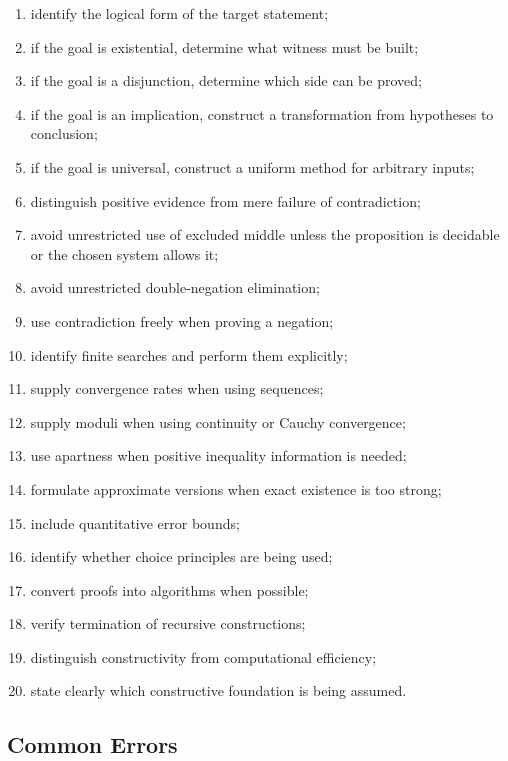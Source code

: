 \begin{enumerate}
    \item identify the logical form of the target statement;
    \item if the goal is existential, determine what witness must be built;
    \item if the goal is a disjunction, determine which side can be proved;
    \item if the goal is an implication, construct a transformation from
          hypotheses to conclusion;
    \item if the goal is universal, construct a uniform method for arbitrary
          inputs;
    \item distinguish positive evidence from mere failure of contradiction;
    \item avoid unrestricted use of excluded middle unless the proposition
          is decidable or the chosen system allows it;
    \item avoid unrestricted double-negation elimination;
    \item use contradiction freely when proving a negation;
    \item identify finite searches and perform them explicitly;
    \item supply convergence rates when using sequences;
    \item supply moduli when using continuity or Cauchy convergence;
    \item use apartness when positive inequality information is needed;
    \item formulate approximate versions when exact existence is too strong;
    \item include quantitative error bounds;
    \item identify whether choice principles are being used;
    \item convert proofs into algorithms when possible;
    \item verify termination of recursive constructions;
    \item distinguish constructivity from computational efficiency;
    \item state clearly which constructive foundation is being assumed.
\end{enumerate}

\subsection{Common Errors}
\label{subsec:constructive-mathematics-common-errors}

